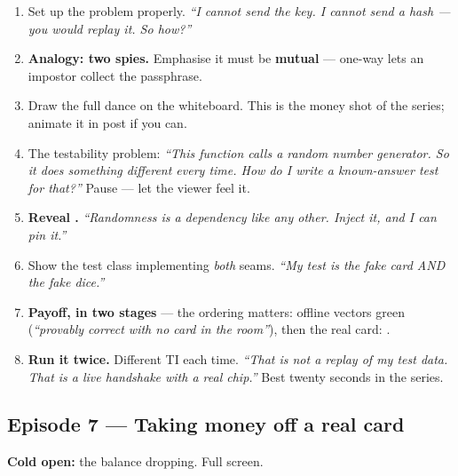\begin{enumerate}
  \item Set up the problem properly. \emph{``I cannot send the key. I cannot send
        a hash --- you would replay it. So how?''}
  \item \textbf{Analogy: two spies.} Emphasise it must be \textbf{mutual} ---
        one-way lets an impostor collect the passphrase.
  \item Draw the full dance on the whiteboard. This is the money shot of the
        series; animate it in post if you can.
  \item The testability problem: \emph{``This function calls a random number
        generator. So it does something different every time. How do I write a
        known-answer test for that?''} Pause --- let the viewer feel it.
  \item \textbf{Reveal .} \emph{``Randomness is a dependency
        like any other. Inject it, and I can pin it.''}
  \item Show the test class implementing \emph{both} seams. \emph{``My test is
        the fake card AND the fake dice.''}
  \item \textbf{Payoff, in two stages} --- the ordering matters:
        offline vectors green (\emph{``provably correct with no card in the
        room''}), then the real card: .
  \item \textbf{Run it twice.} Different TI each time. \emph{``That is not a
        replay of my test data. That is a live handshake with a real chip.''}
        Best twenty seconds in the series.
\end{enumerate}

\subsection{Episode 7 --- Taking money off a real card}

\textbf{Cold open:} the balance dropping. Full screen.


